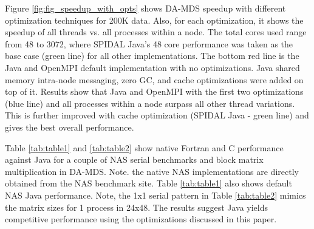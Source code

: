 Figure \ref{fig:fig_speedup_with_opts} shows DA-MDS speedup with different optimization techniques for 200K data. Also, for each optimization, it shows the speedup of all threads vs. all processes within a node. The total cores used range from 48 to 3072, where SPIDAL Java's 48 core performance was taken as the base case (green line) for all other implementations. The bottom red line is the Java and OpenMPI default implementation with no optimizations. Java shared memory intra-node messaging, zero GC, and cache optimizations were added on top of it. Results show that Java and OpenMPI with the first two optimizations (blue line) and all processes within a node surpass all other thread variations. This is further improved with cache optimization (SPIDAL Java - green line) and gives the best overall performance.


Table \ref{tab:table1} and \ref{tab:table2} show native Fortran and C performance against Java for a couple of NAS \cite{nas} serial benchmarks and block matrix multiplication in DA-MDS. Note. the native NAS implementations are directly obtained from the NAS benchmark site. Table \ref{tab:table1} also shows default NAS Java performance. Note, the 1x1 serial pattern in Table \ref{tab:table2} mimics the matrix sizes for 1 process in 24x48. The results suggest Java yields competitive performance using the optimizations discussed in this paper.